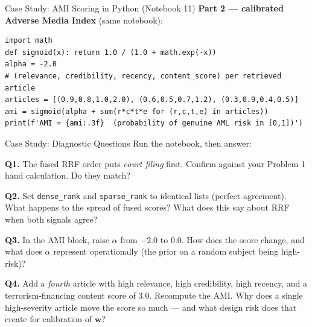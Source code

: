 \documentclass[9pt,t]{beamer}
\begin{document}
\begin{frame}[fragile]{Case Study: AMI Scoring in Python (Notebook 11)}
\textbf{Part 2 --- calibrated Adverse Media Index} (same notebook):

\begin{lstlisting}
import math
def sigmoid(x): return 1.0 / (1.0 + math.exp(-x))
alpha = -2.0
# (relevance, credibility, recency, content_score) per retrieved article
articles = [(0.9,0.8,1.0,2.0), (0.6,0.5,0.7,1.2), (0.3,0.9,0.4,0.5)]
ami = sigmoid(alpha + sum(r*c*t*e for (r,c,t,e) in articles))
print(f'AMI = {ami:.3f}  (probability of genuine AML risk in [0,1])')
\end{lstlisting}
\end{frame}

\begin{frame}{Case Study: Diagnostic Questions}
Run the notebook, then answer:

\medskip
\textbf{Q1.} The fused RRF order puts \emph{court filing} first. Confirm against
your Problem 1 hand calculation. Do they match?

\medskip
\textbf{Q2.} Set \texttt{dense\_rank} and \texttt{sparse\_rank} to identical lists
(perfect agreement). What happens to the spread of fused scores? What does this
say about RRF when both signals agree?

\medskip
\textbf{Q3.} In the AMI block, raise $\alpha$ from $-2.0$ to $0.0$. How does the
score change, and what does $\alpha$ represent operationally (the prior on a
random subject being high-risk)?

\medskip
\textbf{Q4.} Add a \emph{fourth} article with high relevance, high credibility,
high recency, and a terrorism-financing content score of $3.0$. Recompute the AMI.
Why does a single high-severity article move the score so much --- and what design
risk does that create for calibration of $\mathbf{w}$?
\end{frame}
\end{document}
